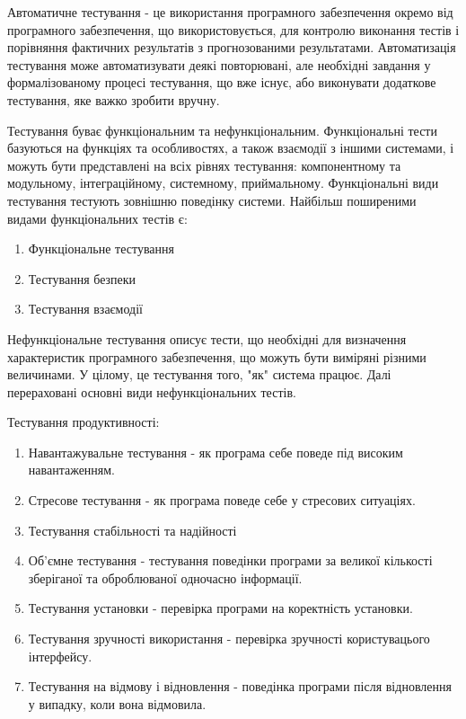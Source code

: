 Автоматичне тестування - це використання програмного забезпечення окремо від програмного забезпечення, що використовується, для контролю виконання тестів і порівняння фактичних результатів з прогнозованими результатами. Автоматизація тестування може автоматизувати деякі повторювані, але необхідні завдання у формалізованому процесі тестування, що вже існує, або виконувати додаткове тестування, яке важко зробити вручну. \cite{huizinga2007automated}

Тестування буває функціональним та нефункціональним.
Функціональні тести базуються на функціях та особливостях, а також взаємодії з іншими системами, і можуть бути представлені на всіх рівнях тестування: компонентному та модульному, інтеграційному, системному, приймальному. Функціональні види тестування тестують зовнішню поведінку системи. Найбільш поширеними видами функціональних тестів є:

\begin{enumerate}
\item Функціональне тестування
\item Тестування безпеки
\item Тестування взаємодії
\end{enumerate}

Нефункціональне тестування описує тести, що необхідні для визначення характеристик програмного забезпечення, що можуть бути виміряні різними величинами. У цілому, це тестування того, "як" система працює. Далі перераховані основні види нефункціональних тестів.

Тестування продуктивності:

\begin{enumerate}
\item Навантажувальне тестування - як програма себе поведе під високим навантаженням.
\item Стресове тестування - як програма поведе себе у стресових ситуаціях.
\item Тестування стабільності та надійності
\item Об'ємне тестування - тестування поведінки програми за великої кількості зберіганої та оброблюваної одночасно інформації.
\item Тестування установки - перевірка програми на коректність установки.
\item Тестування зручності використання - перевірка зручності користувацього інтерфейсу.
\item Тестування на відмову і відновлення - поведінка програми після відновлення у випадку, коли вона відмовила.
\end{enumerate}

